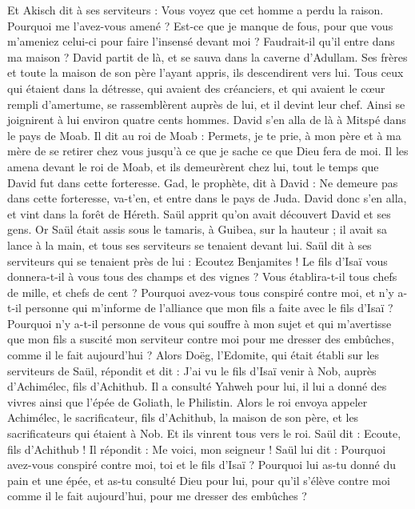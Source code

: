 \begin{multicols}{2}
Et Akisch dit à ses serviteurs : Vous voyez que cet homme a perdu la raison. Pourquoi me l'avez-vous amené ?
Est-ce que je manque de fous, pour que vous m'ameniez celui-ci pour faire l'insensé devant moi ? Faudrait-il qu'il entre dans ma maison ?
\VerseOne{}David partit de là, et se sauva dans la caverne d'Adullam. Ses frères et toute la maison de son père l'ayant appris, ils descendirent vers lui.
Tous ceux qui étaient dans la détresse, qui avaient des créanciers, et qui avaient le cœur rempli d'amertume, se rassemblèrent auprès de lui, et il devint leur chef. Ainsi se joignirent à lui environ quatre cents hommes.
David s'en alla de là à Mitspé dans le pays de Moab. Il dit au roi de Moab : Permets, je te prie, à mon père et à ma mère de se retirer chez vous jusqu'à ce que je sache ce que Dieu fera de moi.
Il les amena devant le roi de Moab, et ils demeurèrent chez lui, tout le temps que David fut dans cette forteresse.
Gad, le prophète, dit à David : Ne demeure pas dans cette forteresse, va-t'en, et entre dans le pays de Juda. David donc s'en alla, et vint dans la forêt de Héreth.
Saül apprit qu'on avait découvert David et ses gens. Or Saül était assis sous le tamaris, à Guibea, sur la hauteur ; il avait sa lance à la main, et tous ses serviteurs se tenaient devant lui.
Saül dit à ses serviteurs qui se tenaient près de lui : Ecoutez Benjamites ! Le fils d'Isaï vous donnera-t-il à vous tous des champs et des vignes ? Vous établira-t-il tous chefs de mille, et chefs de cent ?
Pourquoi avez-vous tous conspiré contre moi, et n'y a-t-il personne qui m'informe de l'alliance que mon fils a faite avec le fils d'Isaï ? Pourquoi n'y a-t-il personne de vous qui souffre à mon sujet et qui m'avertisse que mon fils a suscité mon serviteur contre moi pour me dresser des embûches, comme il le fait aujourd'hui ?
Alors Doëg, l'Edomite, qui était établi sur les serviteurs de Saül, répondit et dit : J'ai vu le fils d'Isaï venir à Nob, auprès d'Achimélec, fils d'Achithub.
Il a consulté Yahweh pour lui, il lui a donné des vivres ainsi que l'épée de Goliath, le Philistin.
Alors le roi envoya appeler Achimélec, le sacrificateur, fils d'Achithub, la maison de son père, et les sacrificateurs qui étaient à Nob. Et ils vinrent tous vers le roi.
Saül dit : Ecoute, fils d'Achithub ! Il répondit : Me voici, mon seigneur !
Saül lui dit : Pourquoi avez-vous conspiré contre moi, toi et le fils d'Isaï ? Pourquoi lui as-tu donné du pain et une épée, et as-tu consulté Dieu pour lui, pour qu'il s'élève contre moi comme il le fait aujourd'hui, pour me dresser des embûches ?

\end{multicols}
